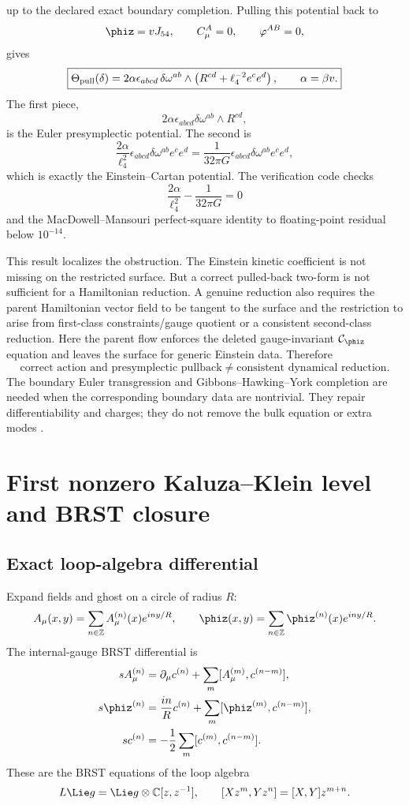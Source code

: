 up to the declared exact boundary completion.  Pulling this potential back to
\[
\phiz=vJ_{54},
\qquad
C_\mu^A=0,
\qquad
\varphi^{AB}=0,
\]
gives
\[
\boxed{
\Theta_{\rm pull}(\delta)
=2\alpha\epsilon_{abcd}\,\delta\omega^{ab}\wedge
\left(R^{cd}+\ell_4^{-2}e^ce^d\right),
\qquad \alpha=\beta v.}
\]
The first piece,
\[
2\alpha\epsilon_{abcd}\delta\omega^{ab}\wedge R^{cd},
\]
is the Euler presymplectic potential.  The second is
\[
\frac{2\alpha}{\ell_4^2}\epsilon_{abcd}\delta\omega^{ab}e^ce^d
=\frac{1}{32\pi G}\epsilon_{abcd}\delta\omega^{ab}e^ce^d,
\]
which is exactly the Einstein--Cartan potential.  The verification code checks
\[
\frac{2\alpha}{\ell_4^2}-\frac{1}{32\pi G}=0
\]
and the MacDowell--Mansouri perfect-square identity to floating-point residual below $10^{-14}$.

This result localizes the obstruction.  The Einstein kinetic coefficient is not missing on the restricted surface.  But a correct pulled-back two-form is not sufficient for a Hamiltonian reduction.  A genuine reduction also requires the parent Hamiltonian vector field to be tangent to the surface and the restriction to arise from first-class constraints/gauge quotient or a consistent second-class reduction.  Here the parent flow enforces the deleted gauge-invariant $\mathcal C_{\phiz}$ equation and leaves the surface for generic Einstein data.  Therefore
\[
\boxed{
\text{correct action and presymplectic pullback}
\neq
\text{consistent dynamical reduction}.}
\]
The boundary Euler transgression and Gibbons--Hawking--York completion are needed when the corresponding boundary data are nontrivial.  They repair differentiability and charges; they do not remove the bulk equation or extra modes \citep{ReggeTeitelboim1974,LeeWald1990,IyerWald1994,PaisSalgadoRebolledoVera2023}.

\section{First nonzero Kaluza--Klein level and BRST closure}
\label{sec:kk}

\subsection{Exact loop-algebra differential}

Expand fields and ghost on a circle of radius $R$:
\[
A_\mu(x,y)=\sum_{n\in\mathbb Z}A_\mu^{(n)}(x)e^{iny/R},
\qquad
\phiz(x,y)=\sum_{n\in\mathbb Z}\phiz^{(n)}(x)e^{iny/R}.
\]
The internal-gauge BRST differential is
\[
\begin{aligned}
sA_\mu^{(n)}&=\partial_\mu c^{(n)}
+\sum_m[A_\mu^{(m)},c^{(n-m)}],\\
s\phiz^{(n)}&=\frac{in}{R}c^{(n)}
+\sum_m[\phiz^{(m)},c^{(n-m)}],\\
sc^{(n)}&=-\frac12\sum_m[c^{(m)},c^{(n-m)}].
\end{aligned}
\]
These are the BRST equations of the loop algebra
\[
L\Lie g=\Lie g\otimes\mathbb C[z,z^{-1}],
\qquad
[Xz^m,Yz^n]=[X,Y]z^{m+n}.
\]

